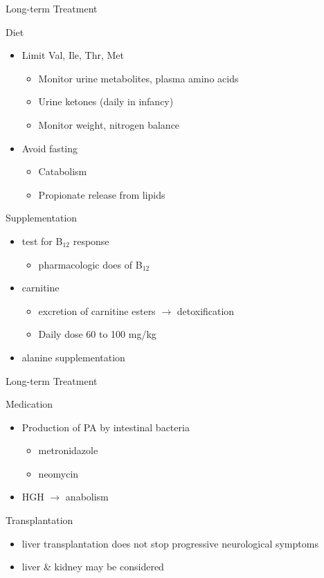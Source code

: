 \documentclass[presentation, smaller]{beamer}
\begin{document}
\begin{frame}[label={sec:orgheadline23}]{Long-term Treatment}
\begin{block}{Diet}
\begin{itemize}
\item Limit Val, Ile, Thr, Met
\begin{itemize}
\item Monitor urine metabolites, plasma amino acids
\item Urine ketones (daily in infancy)
\item Monitor weight, nitrogen balance
\end{itemize}
\item Avoid fasting
\begin{itemize}
\item Catabolism
\item Propionate release from lipids
\end{itemize}
\end{itemize}
\end{block}

\begin{block}{Supplementation}
\begin{itemize}
\item test for B\(_{\text{12}}\) response
\begin{itemize}
\item pharmacologic does of B\(_{\text{12}}\)
\end{itemize}
\item carnitine
\begin{itemize}
\item excretion of carnitine esters \(\to\) detoxification
\item Daily dose 60 to 100 mg/kg
\end{itemize}
\item alanine supplementation
\end{itemize}
\end{block}
\end{frame}

\begin{frame}[label={sec:orgheadline24}]{Long-term Treatment}
\begin{block}{Medication}
\begin{itemize}
\item Production of PA by intestinal bacteria
\begin{itemize}
\item metronidazole
\item neomycin
\end{itemize}
\item HGH \(\to\) anabolism
\end{itemize}
\end{block}

\begin{block}{Transplantation}
\begin{itemize}
\item liver transplantation does not stop progressive neurological symptoms
\item liver \& kidney may be considered
\end{itemize}
\end{block}
\end{frame}
\end{document}
